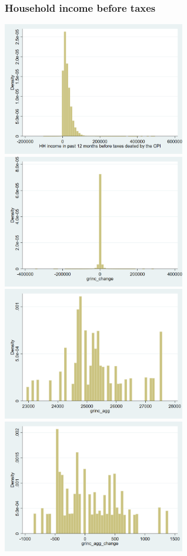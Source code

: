 \documentclass[12pt,a4paper]{article}
\begin{document}
\subsubsection*{Household income before taxes}
\begin{center}
\includegraphics[width=8cm]{grinc.png}
\includegraphics[width=8cm]{grinc_change.png}\\
\includegraphics[width=8cm]{grinc_agg.png}
\includegraphics[width=8cm]{grinc_agg_change.png}\\

\end{center}
\end{document}
